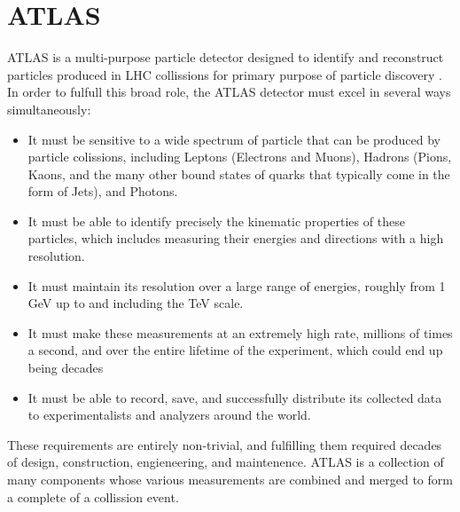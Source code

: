 %
%
%

\section{ATLAS}
ATLAS is a multi-purpose particle detector designed to identify and reconstruct particles produced in LHC collissions for primary purpose of particle discovery \cite{ATLAS_TDR}.
In order to fulfull this broad role, the ATLAS detector must excel in several ways simultaneously:

\begin{itemize}
  \item It must be sensitive to a wide spectrum of particle that can be produced by particle colissions, including Leptons (Electrons and Muons), Hadrons (Pions, Kaons, and the many other bound states of quarks that typically come in the form of Jets), and Photons.
  \item It must be able to identify precisely the kinematic properties of these particles, which includes measuring their energies and directions with a high resolution.
  \item It must maintain its resolution over a large range of energies, roughly from 1 GeV up to and including the TeV scale.
  \item It must make these measurements at an extremely high rate, millions of times a second, and over the entire lifetime of the experiment, which could end up being decades
  \item It must be able to record, save, and successfully distribute its collected data to experimentalists and analyzers around the world.
\end{itemize}

These requirements are entirely non-trivial, and fulfilling them required decades of design, construction, engieneering, and maintenence.  
ATLAS is a collection of many components whose various measurements are combined and merged to form a complete of a collission event.




